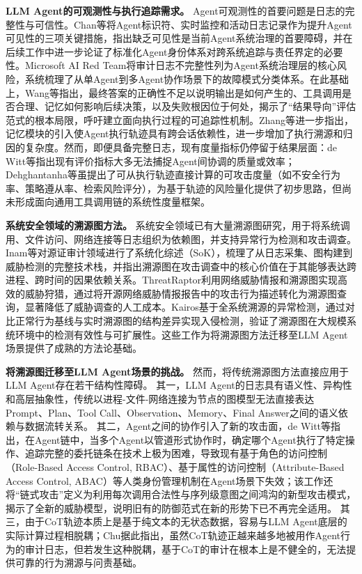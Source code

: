 \textbf{LLM Agent的可观测性与执行追踪需求。}
Agent可观测性的首要问题是日志的完整性与可信性。Chan等\cite{chan2024visibility}将Agent标识符、实时监控和活动日志记录作为提升Agent可见性的三项关键措施，指出缺乏可见性是当前Agent系统治理的首要障碍，并在后续工作\cite{chan2024ids}中进一步论证了标准化Agent身份体系对跨系统追踪与责任界定的必要性。Microsoft AI Red Team\cite{microsoft2025taxonomy}将审计日志不完整性列为Agent系统治理层的核心风险，系统梳理了从单Agent到多Agent协作场景下的故障模式分类体系。在此基础上，Wang等\cite{wang2026agenttraces}指出，最终答案的正确性不足以说明输出是如何产生的、工具调用是否合理、记忆如何影响后续决策，以及失败根因位于何处，揭示了“结果导向”评估范式的根本局限，呼吁建立面向执行过程的可追踪性机制。Zhang等\cite{zhang2025survey}进一步指出，记忆模块的引入使Agent执行轨迹具有跨会话依赖性，进一步增加了执行溯源和归因的复杂度。然而，即便具备完整日志，现有度量指标仍停留于结果层面：de Witt等\cite{dewitt2026openchallenges}指出现有评价指标大多无法捕捉Agent间协调的质量或效率；Dehghantanha等\cite{dehghantanha2026sokattacksurfaceagentic}虽提出了可从执行轨迹直接计算的可攻击度量（如不安全行为率、策略遵从率、检索风险评分），为基于轨迹的风险量化提供了初步思路，但尚未形成面向通用工具调用链的系统性度量框架。

\textbf{系统安全领域的溯源图方法。}
系统安全领域已有大量溯源图研究，用于将系统调用、文件访问、网络连接等日志组织为依赖图，并支持异常行为检测和攻击调查。Inam等\cite{inam2023sok}对源证审计领域进行了系统化综述（SoK），梳理了从日志采集、图构建到威胁检测的完整技术栈，并指出溯源图在攻击调查中的核心价值在于其能够表达跨进程、跨时间的因果依赖关系。ThreatRaptor\cite{gao2021threatraptor}利用网络威胁情报和溯源图实现高效的威胁狩猎，通过将开源网络威胁情报报告中的攻击行为描述转化为溯源图查询，显著降低了威胁调查的人工成本。Kairos\cite{cheng2024kairos}基于全系统溯源的异常检测，通过对比正常行为基线与实时溯源图的结构差异实现入侵检测，验证了溯源图在大规模系统环境中的检测有效性与可扩展性。这些工作为将溯源图方法迁移至LLM Agent场景提供了成熟的方法论基础。

\textbf{将溯源图迁移至LLM Agent场景的挑战。}
然而，将传统溯源图方法直接应用于LLM Agent存在若干结构性障碍。
其一，LLM Agent的日志具有语义性、异构性和高层抽象性，传统以进程-文件-网络连接为节点的图模型无法直接表达
Prompt、Plan、Tool Call、Observation、Memory、Final Answer之间的语义依赖与数据流转关系。
其二，Agent之间的协作引入了新的攻击面，de Witt等\cite{dewitt2026openchallenges}指出，在Agent链中，当多个Agent以管道形式协作时，确定哪个Agent执行了特定操作、追踪完整的委托链条在技术上极为困难，导致现有基于角色的访问控制（Role-Based Access Control, RBAC）、基于属性的访问控制（Attribute-Based Access Control, ABAC）等人类身份管理机制在Agent场景下失效；该工作还将“链式攻击”定义为利用每次调用合法性与序列级意图之间鸿沟的新型攻击模式，揭示了全新的威胁模型，说明旧有的防御范式在新的形势下已不再完全适用。
其三，由于CoT轨迹本质上是基于纯文本的无状态数据，容易与LLM Agent底层的实际计算过程相脱耦；Chu\cite{chu2026systematic}据此指出，虽然CoT轨迹正越来越多地被用作Agent行为的审计日志，但若发生这种脱耦，基于CoT的审计在根本上是不健全的，无法提供可靠的行为溯源与问责基础。

